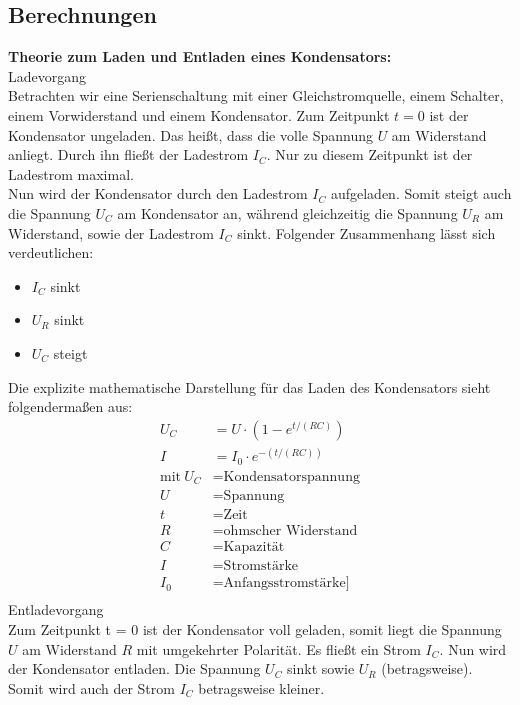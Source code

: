 \subsection{Berechnungen}
\textbf{Theorie zum Laden und Entladen eines Kondensators:\\}
Ladevorgang\\
Betrachten wir eine Serienschaltung mit einer Gleichstromquelle, einem Schalter, einem Vorwiderstand und einem Kondensator. 
Zum Zeitpunkt $t = 0$ ist der Kondensator ungeladen. Das heißt, dass die volle Spannung $U$ am Widerstand anliegt. Durch ihn fließt der Ladestrom $I_C$. Nur zu diesem Zeitpunkt ist der Ladestrom maximal.\\
Nun wird der Kondensator durch den Ladestrom $I_C$ aufgeladen. Somit steigt auch die Spannung $U_C$ am Kondensator an, während gleichzeitig die Spannung $U_R$ am Widerstand, sowie der Ladestrom $I_C$ sinkt. Folgender Zusammenhang lässt sich verdeutlichen:\\
\begin{itemize}
\item $I_C$ sinkt
\end{itemize}
\begin{itemize}
\item $U_R $ sinkt
\end{itemize}
\begin{itemize}
\item $U_C $ steigt
\end{itemize}
Die explizite mathematische Darstellung für das Laden des Kondensators sieht folgendermaßen aus:
\begin{align*}
U_C &= U \cdot (1 - e^{t/(RC)})\\
I &= I_0 \cdot e^{-(t/(RC))}\\
\text{mit} \ U_C &= \text{Kondensatorspannung}\\
U &= \text{Spannung}\\
t &= \text{Zeit}\\
R &= \text{ohmscher Widerstand}\\
C &= \text{Kapazität}\\
I &= \text{Stromstärke}\\
I_0 &= \text{Anfangsstromstärke]}\\
\end{align*}
Entladevorgang\\
Zum Zeitpunkt t = 0 ist der Kondensator voll geladen, somit liegt die Spannung $U$ am Widerstand $R$ mit umgekehrter Polarität. Es fließt ein Strom $I_C$. Nun wird der Kondensator entladen. Die Spannung $U_C$ sinkt sowie $U_R$ (betragsweise). Somit wird auch der Strom $I_C$ betragsweise kleiner.\\
